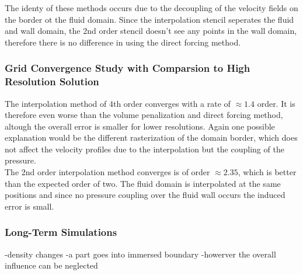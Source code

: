  The identy of these methods occurs due to the decoupling of the velocity fields
on the border ot the fluid domain. Since the interpolation stencil seperates the fluid and wall domain, the 2nd order
stencil doesn't see any points in the wall domain, therefore there is no difference in using the direct forcing method.\\

\subsubsection{Grid Convergence Study with Comparsion to High Resolution Solution}
\label{vali:hpflow_discussion}

The interpolation method of 4th order converges with a rate of $\approx 1.4$ order. It is therefore even worse than the volume penalization and
direct forcing method, altough the overall error is smaller for lower resolutions. Again one possible explanation would be the different rasterization
of the domain border, which does not affect the velocity profiles due to the interpolation but the coupling of the pressure.\\
The 2nd order interpolation method converges is of order $\approx 2.35$, which is better than the expected order of two.
The fluid domain is interpolated at the same positions and since no pressure coupling over the fluid wall occurs the induced error is small.

\subsubsection{Long-Term Simulations}
-density changes
-a part goes into immersed boundary
-howerver the overall influence can be neglected



